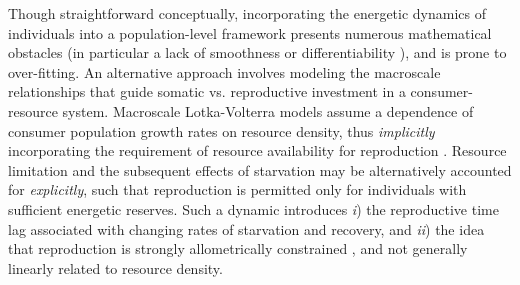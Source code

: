 \documentclass{pnastwo}
\begin{document}
\begin{article}
Though straightforward conceptually, incorporating the energetic dynamics of individuals \cite{Kooi2000} into a population-level framework \cite{Kooi2000,Sousa:2010ez} presents numerous mathematical obstacles (in particular a lack of smoothness or differentiability \cite{Diekmann:2010da}), and is prone to over-fitting.
An alternative approach involves modeling the macroscale relationships that guide somatic vs. reproductive investment in a consumer-resource system. %
Macroscale Lotka-Volterra models assume a dependence of consumer population growth rates on resource density, thus \emph{implicitly} incorporating the requirement of resource availability for reproduction \cite{murdoch:2003}.
Resource limitation and the subsequent effects of starvation may be alternatively accounted for \emph{explicitly}, such that reproduction is permitted only for individuals with sufficient energetic reserves.
Such a dynamic introduces 
\emph{i}) the reproductive time lag associated with changing rates of starvation and recovery, and 
\emph{ii}) the idea that reproduction is strongly allometrically constrained \cite{Kempes:2012hy}, and not generally linearly related to resource density.





\end{article}
\end{document}
